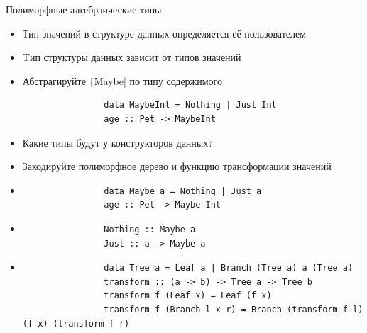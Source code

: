     \begin{frame}[fragile]{Полиморфные алгебраические типы}
        \begin{itemize}
            \item Тип значений в структуре данных определяется её пользователем
            \item Tип структуры данных зависит от типов значений
            \item[\todo] Абстрагируйте \texttt|Maybe| по типу содержимого
            \begin{verbatim}
                data MaybeInt = Nothing | Just Int
                age :: Pet -> MaybeInt
            \end{verbatim}
            \item[\todo] Какие типы будут у конструкторов данных?
            \item[\todo] Закодируйте полиморфное дерево и функцию трансформации значений
            \item[\answer] \pause
            \begin{verbatim}
                data Maybe a = Nothing | Just a
                age :: Pet -> Maybe Int
            \end{verbatim}
            \item[\answer] \pause
            \begin{verbatim}
                Nothing :: Maybe a
                Just :: a -> Maybe a
            \end{verbatim}
            \item[\answer] \pause
            \begin{verbatim}
                data Tree a = Leaf a | Branch (Tree a) a (Tree a)
                transform :: (a -> b) -> Tree a -> Tree b
                transform f (Leaf x) = Leaf (f x)
                transform f (Branch l x r) = Branch (transform f l) (f x) (transform f r)
            \end{verbatim}
        \end{itemize}
    \end{frame}

